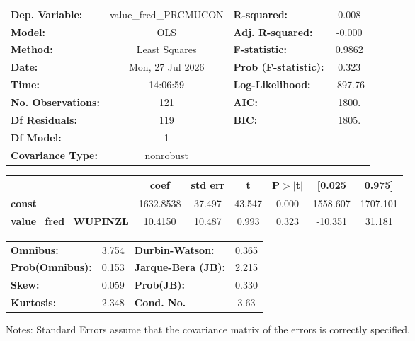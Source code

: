 \begin{center}
\begin{tabular}{lclc}
\toprule
\textbf{Dep. Variable:}       & value\_fred\_PRCMUCON & \textbf{  R-squared:         } &     0.008   \\
\textbf{Model:}               &          OLS          & \textbf{  Adj. R-squared:    } &    -0.000   \\
\textbf{Method:}              &     Least Squares     & \textbf{  F-statistic:       } &    0.9862   \\
\textbf{Date:}                &    Mon, 27 Jul 2026   & \textbf{  Prob (F-statistic):} &    0.323    \\
\textbf{Time:}                &        14:06:59       & \textbf{  Log-Likelihood:    } &   -897.76   \\
\textbf{No. Observations:}    &            121        & \textbf{  AIC:               } &     1800.   \\
\textbf{Df Residuals:}        &            119        & \textbf{  BIC:               } &     1805.   \\
\textbf{Df Model:}            &              1        & \textbf{                     } &             \\
\textbf{Covariance Type:}     &       nonrobust       & \textbf{                     } &             \\
\bottomrule
\end{tabular}
\begin{tabular}{lcccccc}
                              & \textbf{coef} & \textbf{std err} & \textbf{t} & \textbf{P$> |$t$|$} & \textbf{[0.025} & \textbf{0.975]}  \\
\midrule
\textbf{const}                &    1632.8538  &       37.497     &    43.547  &         0.000        &     1558.607    &     1707.101     \\
\textbf{value\_fred\_WUPINZL} &      10.4150  &       10.487     &     0.993  &         0.323        &      -10.351    &       31.181     \\
\bottomrule
\end{tabular}
\begin{tabular}{lclc}
\textbf{Omnibus:}       &  3.754 & \textbf{  Durbin-Watson:     } &    0.365  \\
\textbf{Prob(Omnibus):} &  0.153 & \textbf{  Jarque-Bera (JB):  } &    2.215  \\
\textbf{Skew:}          &  0.059 & \textbf{  Prob(JB):          } &    0.330  \\
\textbf{Kurtosis:}      &  2.348 & \textbf{  Cond. No.          } &     3.63  \\
\bottomrule
\end{tabular}
\end{center}

Notes: \newline
 [1] Standard Errors assume that the covariance matrix of the errors is correctly specified.